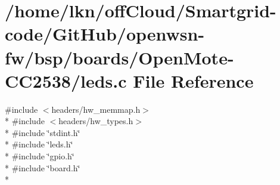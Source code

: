 \hypertarget{_open_mote-_c_c2538_2leds_8c}{}\section{/home/lkn/off\+Cloud/\+Smartgrid-\/code/\+Git\+Hub/openwsn-\/fw/bsp/boards/\+Open\+Mote-\/\+C\+C2538/leds.c File Reference}
\label{_open_mote-_c_c2538_2leds_8c}
{\ttfamily \#include $<$headers/hw\+\_\+memmap.\+h$>$}\\*
{\ttfamily \#include $<$headers/hw\+\_\+types.\+h$>$}\\*
{\ttfamily \#include \char`\"{}stdint.\+h\char`\"{}}\\*
{\ttfamily \#include \char`\"{}leds.\+h\char`\"{}}\\*
{\ttfamily \#include \char`\"{}gpio.\+h\char`\"{}}\\*
{\ttfamily \#include \char`\"{}board.\+h\char`\"{}}\\*
